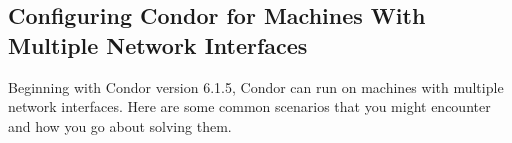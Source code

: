 \subsection{\label{sec:Multiple-Interfaces}Configuring Condor for
Machines With Multiple Network Interfaces } 


%
%
%
%


Beginning with Condor version 6.1.5, Condor can run on machines with
multiple network interfaces. Here are some common scenarios that you might
encounter and how you go about solving them.

